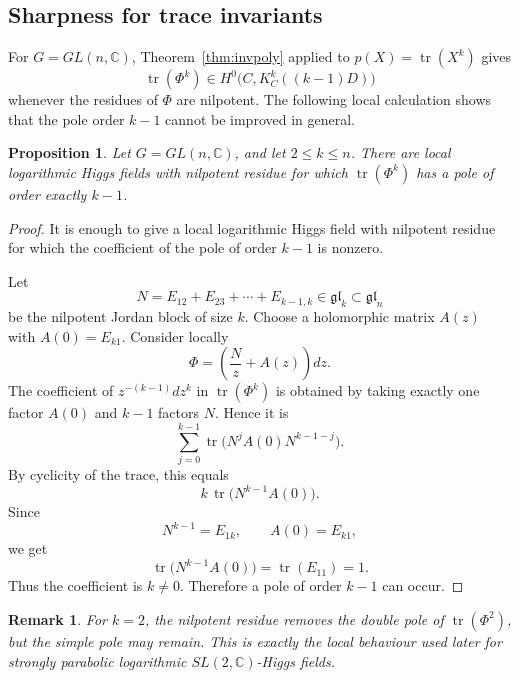 \documentclass[10pt,a4paper]{amsart}
\numberwithin{equation}{section}
\newtheorem{proposition}[theorem]{Proposition}
\newtheorem{remark}[theorem]{Remark}
\begin{document}
\subsection{Sharpness for trace invariants}

For \(G=GL(n,\mathbb C)\), Theorem~\ref{thm:invpoly} applied to
\(
        p(X)=\operatorname{tr}(X^k)
\)
gives
\[
        \operatorname{tr}(\Phi^k)
        \in
        H^0\bigl(C,K_C^k((k-1)D)\bigr)
\]
whenever the residues of \(\Phi\) are nilpotent.  The following local
calculation shows that the pole order \(k-1\) cannot be improved in general.

\begin{proposition}
\label{prop:trace-sharp}
Let \(G=GL(n,\mathbb C)\), and let \(2\leq k\leq n\).  There are local logarithmic Higgs fields with nilpotent residue for which
\(
        \operatorname{tr}(\Phi^k)
\)
has a pole of order exactly \(k-1\).
\end{proposition}

\begin{proof}
It is enough to give a local logarithmic Higgs field with nilpotent residue for
which the coefficient of the pole of order \(k-1\) is nonzero.

Let
\[
        N=E_{12}+E_{23}+\cdots+E_{k-1,k}
        \in\mathfrak{gl}_k\subset\mathfrak{gl}_n
\]
be the nilpotent Jordan block of size \(k\). Choose a holomorphic matrix
\(A(z)\) with
\(
        A(0)=E_{k1}.
\)
Consider locally
\[
        \Phi=
        \left(
        \frac{N}{z}+A(z)
        \right)dz .
\]
The coefficient of \(z^{-(k-1)}dz^k\) in \(\operatorname{tr}(\Phi^k)\) is
obtained by taking exactly one factor \(A(0)\) and \(k-1\) factors \(N\). Hence
it is
\[
        \sum_{j=0}^{k-1}
        \operatorname{tr}
        \bigl(
        N^jA(0)N^{k-1-j}
        \bigr).
\]
By cyclicity of the trace, this equals
\[
        k\,\operatorname{tr}\bigl(N^{k-1}A(0)\bigr).
\]
Since
\[
        N^{k-1}=E_{1k},
        \qquad
        A(0)=E_{k1},
\]
we get
\[
        \operatorname{tr}\bigl(N^{k-1}A(0)\bigr)
        =
        \operatorname{tr}(E_{11})
        =
        1.
\]
Thus the coefficient is \(k\neq0\).  Therefore a pole of order \(k-1\) can occur.
\end{proof}

\begin{remark}
For \(k=2\), the nilpotent residue removes the double pole of
\(\operatorname{tr}(\Phi^2)\), but the simple pole may remain.  This is exactly
the local behaviour used later for strongly parabolic logarithmic
\(SL(2,\mathbb C)\)-Higgs fields.
\end{remark}
\end{document}
